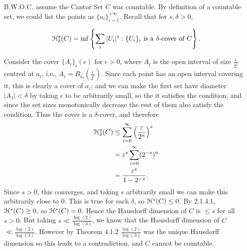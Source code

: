 B.W.O.C. assume the Cantor Set \(C\) was countable. By definition of a countable set, we could list the points as \(\{a_i\}_{i=1}^{+\infty}\). Recall that for \(s,\delta > 0\), 

\[\mathcal{H}_\delta^s (C) = \inf \left\{\sum_i |U_i|^s : \{U_i\}_i \text{ is a } \delta\text{-cover of } C \right\}.\]

Consider the cover \(\{A_i\}_i(\epsilon)\) for \(\epsilon > 0\), where \(A_i\) is the open interval of size \(\frac{\epsilon}{2^i}\) centred at \(a_i\), i.e., \(A_i = B_{a_i} \left(\frac{\epsilon}{2^i}\right)\). Since each point has an open interval covering it, this is clearly a cover of \(a_i\); and we can make the first set have diameter \(|A_1| < \delta\) by taking \(\epsilon\) to be arbitrarily small, so the it satisfies the condition, and since the set sizes monotonically decrease the rest of them also satisfy the condition. Thus the cover is a \(\delta\)-cover, and therefore
\begin{align*} 
 \mathcal{H}_\delta^s (C) &\leq \sum_{i=0}^\infty \left(\frac{\varepsilon}{2^n}\right)^s \\
 &= \varepsilon^s \sum_{i=0}^{\infty} (2^{-s})^n \\
 &= \frac{\varepsilon^s}{1-2^{-s}}.
\end{align*}
Since \(s > 0\), this converges, and taking \(\epsilon\) arbitrarily small we can make this arbitrarily close to 0. This is true for each \(\delta\), so \(\mathcal{H}^s(C) \leq 0\). By 2.1.4.1, \(\mathcal{H}^s(C) \geq 0\), so \(\mathcal{H}^s(C) = 0\). Hence the Hausdorff dimension of \(C\) is \(\leq s\) for all \(s > 0\). But taking \(s \ll \frac{\log(2)}{\log(3)}\), we know that the Hausdorff dimension of \(C\) \( \ll \frac{\log(2)}{\log(3)}\). However by Theorem 4.1.2 \(\frac{\log(2)}{\log(3)}\) was the unique Hausdorff dimension so this leads to a contradiction, and \(C\) cannot be countable.